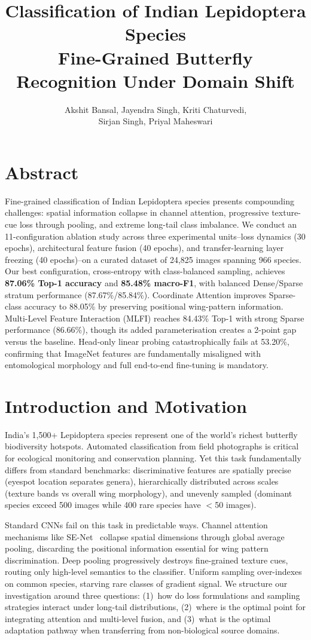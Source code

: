 \documentclass[11pt]{article}
\title{\textbf{Classification of Indian Lepidoptera Species}\\
\Large Fine-Grained Butterfly Recognition Under Domain Shift}
\author{
  Akshit Bansal, Jayendra Singh, Kriti Chaturvedi,\\
  Sirjan Singh, Priyal Maheswari
}
\date{}
\begin{document}
\maketitle

\section{Abstract}
Fine-grained classification of Indian Lepidoptera species presents compounding challenges: spatial information collapse in channel attention, progressive texture-cue loss through pooling, and extreme long-tail class imbalance. We conduct an 11-configuration ablation study across three experimental units--loss dynamics (30 epochs), architectural feature fusion (40 epochs), and transfer-learning layer freezing (40 epochs)--on a curated dataset of 24,825 images spanning 966 species. Our best configuration, cross-entropy with class-balanced sampling, achieves \textbf{87.06\% Top-1 accuracy} and \textbf{85.48\% macro-F1}, with balanced Dense/Sparse stratum performance (87.67\%/85.84\%). Coordinate Attention improves Sparse-class accuracy to 88.05\% by preserving positional wing-pattern information. Multi-Level Feature Interaction (MLFI) reaches 84.43\% Top-1 with strong Sparse performance (86.66\%), though its added parameterisation creates a 2-point gap versus the baseline. Head-only linear probing catastrophically fails at 53.20\%, confirming that ImageNet features are fundamentally misaligned with entomological morphology and full end-to-end fine-tuning is mandatory.

\section{Introduction and Motivation}

India's 1,500+ Lepidoptera species represent one of the world's richest butterfly biodiversity hotspots. Automated classification from field photographs is critical for ecological monitoring and conservation planning. Yet this task fundamentally differs from standard benchmarks: discriminative features are spatially precise (eyespot location separates genera), hierarchically distributed across scales (texture bands vs overall wing morphology), and unevenly sampled (dominant species exceed 500 images while 400 rare species have $<$50 images).

Standard CNNs fail on this task in predictable ways. Channel attention mechanisms like SE-Net~\cite{hu2018squeeze} collapse spatial dimensions through global average pooling, discarding the positional information essential for wing pattern discrimination. Deep pooling progressively destroys fine-grained texture cues, routing only high-level semantics to the classifier. Uniform sampling over-indexes on common species, starving rare classes of gradient signal. We structure our investigation around three questions: (1)~how do loss formulations and sampling strategies interact under long-tail distributions, (2)~where is the optimal point for integrating attention and multi-level fusion, and (3)~what is the optimal adaptation pathway when transferring from non-biological source domains.
\end{document}
